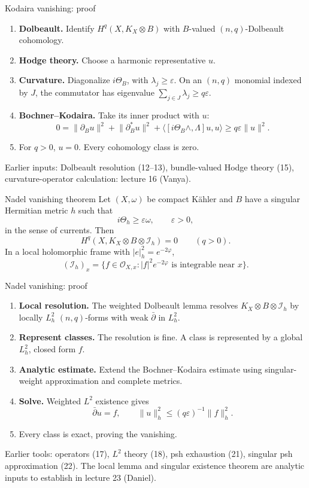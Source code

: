 \documentclass[aspectratio=169,11pt]{beamer}
\newcommand{\cI}{\mathcal I}
\newcommand{\cO}{\mathcal O}
\newcommand{\db}{\bar\partial}
\newcommand{\norm}[1]{\lVert#1\rVert}
\begin{document}
\begin{frame}{Kodaira vanishing: proof}
\begin{enumerate}
\setlength{\itemsep}{7pt}
\item \textbf{Dolbeault.} Identify \(H^q(X,K_X\otimes B)\)
with \(B\)-valued \((n,q)\)-Dolbeault cohomology.
\item \textbf{Hodge theory.} Choose a harmonic representative \(u\).
\item \textbf{Curvature.} Diagonalize \(i\Theta_B\), with
\(\lambda_j\ge\varepsilon\). On an \((n,q)\) monomial indexed by \(J\),
the commutator has eigenvalue
\(\sum_{j\in J}\lambda_j\ge q\varepsilon\).
\item \textbf{Bochner--Kodaira.} Take its inner product with \(u\):
\[
0=\norm{\partial_Bu}^2+\norm{\partial_B^*u}^2
+\langle[i\Theta_B\wedge,\Lambda]u,u\rangle
\ge q\varepsilon\norm{u}^2.
\]
\item For \(q>0\), \(u=0\). Every cohomology class is zero.
\end{enumerate}
\medskip
\footnotesize
Earlier inputs: Dolbeault resolution (12--13), bundle-valued Hodge theory
(15), curvature-operator calculation: lecture 16 (Vanya).
\end{frame}

\begin{frame}{Nadel vanishing theorem}
Let \((X,\omega)\) be compact Kähler and \(B\) have a singular
Hermitian metric \(h\) such that
\[
i\Theta_h\ge\varepsilon\omega,\qquad \varepsilon>0,
\]
in the sense of currents. Then
\[
\boxed{H^q(X,K_X\otimes B\otimes\cI_h)=0\qquad(q>0).}
\]
In a local holomorphic frame with \(|e|_h^2=e^{-2\varphi}\),
\[
(\cI_h)_x=\{f\in\cO_{X,x}:|f|^2e^{-2\varphi}
\text{ is integrable near }x\}.
\]
\end{frame}

\begin{frame}{Nadel vanishing: proof}
\begin{enumerate}
\setlength{\itemsep}{7pt}
\item \textbf{Local resolution.} The weighted Dolbeault lemma
resolves \(K_X\otimes B\otimes\cI_h\) by locally \(L^2_h\)
\((n,q)\)-forms with weak \(\db\) in \(L^2_h\).
\item \textbf{Represent classes.} The resolution is fine.
A class is represented by a global \(L^2_h\), closed form \(f\).
\item \textbf{Analytic estimate.} Extend the Bochner--Kodaira estimate
using singular-weight approximation and complete metrics.
\item \textbf{Solve.} Weighted \(L^2\) existence gives
\[
\db u=f,\qquad \norm{u}_h^2\le(q\varepsilon)^{-1}\norm{f}_h^2.
\]
\item Every class is exact, proving the vanishing.
\end{enumerate}
\medskip
\footnotesize
Earlier tools: operators (17), \(L^2\) theory (18), psh exhaustion (21),
singular psh approximation (22). The local lemma and singular existence
theorem are analytic inputs to establish in lecture 23 (Daniel).
\end{frame}
\end{document}
